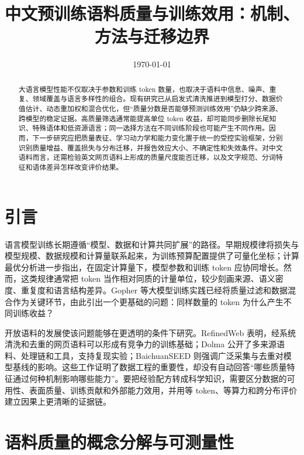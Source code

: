 \documentclass[11pt,a4paper]{article}
\title{中文预训练语料质量与训练效用：机制、方法与迁移边界}
\author{}
\date{\today}
\begin{document}
\maketitle

\begin{abstract}
大语言模型性能不仅取决于参数和训练 token 数量，也取决于语料中信息、噪声、重复、领域覆盖与语言多样性的组合。现有研究已从启发式清洗推进到模型打分、数据价值估计、动态重加权和混合优化，但“质量分数是否能够预测训练效用”仍缺少跨来源、跨模型的稳定证据。高质量筛选通常能提高单位 token 收益，却可能同步删除长尾知识、特殊语体和低资源语言；同一选择方法在不同训练阶段也可能产生不同作用。因而，下一步研究应把质量表征、学习动力学和能力变化置于统一的受控实验框架，分别识别质量增益、覆盖损失与分布迁移，并报告效应大小、不确定性和失效条件。对中文语料而言，还需检验英文网页语料上形成的质量尺度能否迁移，以及文字规范、分词特征和语体差异怎样改变评价结果。
\end{abstract}

\section{引言}

语言模型训练长期遵循“模型、数据和计算共同扩展”的路径。早期规模律将损失与模型规模、数据规模和计算量联系起来，为训练预算配置提供了可量化坐标\cite{scalinglawsfor2020}；计算最优分析进一步指出，在固定计算量下，模型参数和训练 token 应协同增长\cite{trainingcomputeoptimal2022}。然而，这类规律通常把 token 当作相对同质的计量单位，较少刻画来源、语义密度、重复度和语言结构差异。Gopher 等大模型训练实践已经将质量过滤和数据混合作为关键环节\cite{scalinglanguagemodels2021}，由此引出一个更基础的问题：同样数量的 token 为什么产生不同训练收益？

开放语料的发展使该问题能够在更透明的条件下研究。RefinedWeb 表明，经系统清洗和去重的网页语料可以形成有竞争力的训练基础\cite{therefinedwebdataset2023}；Dolma 公开了多来源语料、处理链和工具，支持复现实验\cite{dolmaanopen2024}；BaichuanSEED 则强调广泛采集与去重对模型基线的影响\cite{baichuanseedsharingthe2024}。这些工作证明了数据工程的重要性，却没有自动回答“哪些质量特征通过何种机制影响哪些能力”。要把经验配方转成科学知识，需要区分数据的可用性、表面质量、训练贡献和外部能力效用，并用等 token、等算力和跨分布评价建立因果上更清晰的证据链。

\section{语料质量的概念分解与可测量性}
\end{document}
